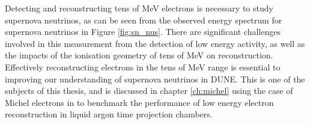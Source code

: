Detecting and reconstructing tens of MeV electrons is necessary to study 
supernova neutrinos, as can be seen from the observed energy spectrum for 
supernova neutrinos in Figure \ref{fig:sn_nus}. There are significant 
challenges involved in this measurement from the detection of low energy 
activity, as well as the impacts of the ionisation geometry of tens of MeV on 
reconstruction.  Effectively reconstructing electrons in the tens of MeV range 
is essential to improving our understanding of supernova neutrinos in DUNE. 
This is one of the subjects of this thesis, and is discussed in chapter 
\ref{ch:michel} using the case of Michel electrons in \protodune{} to 
benchmark the performance of low energy electron reconstruction in liquid 
argon time projection chambers.
